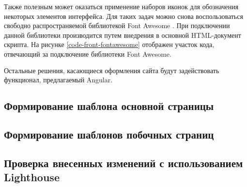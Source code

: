 
Также полезным может оказаться применение наборов иконок для обозначения некоторых элементов интерфейса.
Для таких задач можно снова воспользоваться свободно распространяемой библиотекой Font Awesome \cite{fontawesome}.
При подключении данной библиотеки производится путем внедрения в основной HTML-документ скрипта.
На рисунке \ref{code-front-fontawesome} отображен участок кода, отвечающий за подключение библиотеки Font Awesome.


Остальные решения, касающиеся оформления сайта будут задействовать функционал, предлагаемый Angular.

\subsection{Формирование шаблона основной страницы}

\subsection{Формирование шаблонов побочных страниц}


\subsection{Проверка внесенных изменений с использованием Lighthouse}


\clearpage
